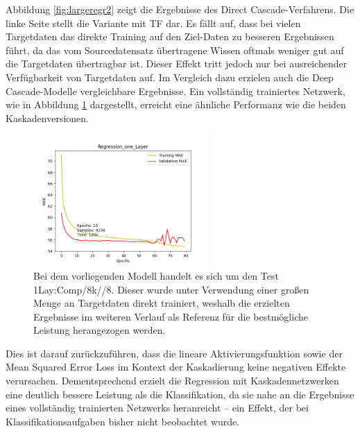 Abbildung \ref{fig:largeregr2} zeigt die Ergebnisse des Direct Cascade-Verfahrens. Die linke Seite stellt die Variante mit TF dar. Es fällt auf, 
dass bei vielen Targetdaten das direkte Training auf den Ziel-Daten zu besseren Ergebnissen führt, da das vom Sourcedatensatz 
übertragene Wissen oftmals weniger gut auf die Targetdaten übertragbar ist. Dieser Effekt tritt jedoch nur bei ausreichender Verfügbarkeit 
von Targetdaten auf. Im Vergleich dazu erzielen auch die Deep Cascade-Modelle vergleichbare Ergebnisse. Ein vollständig trainiertes Netzwerk, 
wie in Abbildung \ref{fig:largeregr2comp} dargestellt, erreicht eine ähnliche Performanz wie die beiden Kaskadenversionen.

\begin{figure}[htpb]
    \centering
    \includegraphics[height=5cm]{../../Plots/ba_plots/regression_large/onelayer_complete.png}
    \caption{\label{fig:largeregr2comp} 
    \small{Bei dem vorliegenden Modell handelt es sich um den Test 1Lay:Comp/8k//8. Dieser wurde unter Verwendung einer großen Menge an Targetdaten direkt 
    trainiert, weshalb die erzielten Ergebnisse im weiteren Verlauf als Referenz für die bestmögliche Leistung herangezogen werden.}}
\end{figure}

Dies ist darauf zurückzuführen, dass die lineare Aktivierungsfunktion sowie der Mean Squared Error Loss im Kontext der Kaskadierung keine 
negativen Effekte verursachen. Dementsprechend erzielt die Regression mit Kaskadennetzwerken eine deutlich bessere Leistung als die 
Klassifikation, da sie nahe an die Ergebnisse eines vollständig trainierten Netzwerks heranreicht – ein Effekt, der bei Klassifikationsaufgaben 
bisher nicht beobachtet wurde.
